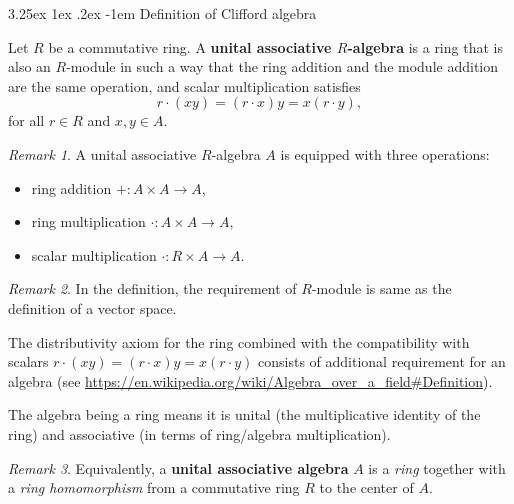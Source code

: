 \documentclass[12pt, letterpaper]{article}
\makeatletter
\renewcommand\paragraph{\@startsection{paragraph}{4}{\z@}%
	{3.25ex \@plus1ex \@minus.2ex}%
	{-1em}%
	{\normalfont\normalsize\bfseries}}
\theoremstyle{definition}
\theoremstyle{remark}
\newtheorem*{rem*}{Remark}
\theoremstyle{definition}
\theoremstyle{plain}
\numberwithin{equation}{section}
\makeatother
\begin{document}
	\paragraph{Definition of Clifford algebra}
	\begin{def*}
		Let $R$ be a commutative ring. A \textbf{unital associative $R$-algebra} is a ring that is also an $R$-module
		in such a way that the ring addition and the module addition are the same operation, and scalar multiplication satisfies
		\[r\cdot (xy)=(r\cdot x)y=x(r\cdot y),\]
		for all $r\in R$ and $x, y \in A$.
	\end{def*}
	\begin{rem*}
		A unital associative $R$-algebra $A$ is equipped with three operations:
		\begin{itemize}
			\item ring addition $+\colon A\times A \to A$,
			\item ring multiplication $\cdot\colon A\times A \to A$,
			\item scalar multiplication $\cdot \colon R\times A\to A$.
		\end{itemize}
	\end{rem*}
	\begin{rem*}
		In the definition, the requirement of $R$-module is same as the definition of a vector space.
		
		The distributivity axiom for the ring combined with the compatibility with scalars
		$r\cdot (xy)=(r\cdot x)y=x(r\cdot y)$ consists of additional requirement for an algebra
		(see \url{https://en.wikipedia.org/wiki/Algebra_over_a_field#Definition}).
		
		The algebra being a ring means it is unital (the multiplicative identity of the ring)
		and associative (in terms of ring/algebra multiplication).
	\end{rem*}
	\begin{rem*}\label{remRingAsUniAssAlgebra}
		Equivalently, a \textbf{unital associative algebra} $A$ is a \textit{ring} together with a \textit{ring homomorphism}
		from a commutative ring $R$ to the center of $A$.
	\end{rem*}
\end{document}
